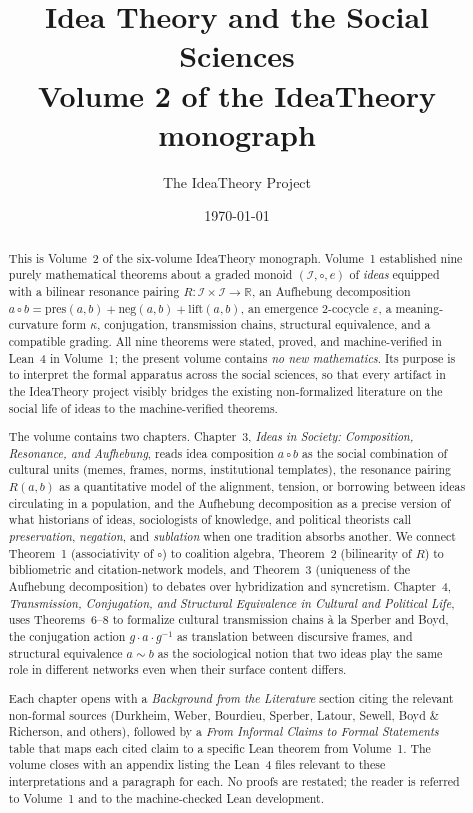 \documentclass[11pt,oneside]{book}
\title{Idea Theory and the Social Sciences\\
\large Volume 2 of the IdeaTheory monograph}
\author{The IdeaTheory Project}
\date{\today}
\begin{document}
\frontmatter
\maketitle

\begin{abstract}
This is Volume~2 of the six-volume IdeaTheory monograph. Volume~1
established nine purely mathematical theorems about a graded monoid
$(\mathcal{I},\circ,e)$ of \emph{ideas} equipped with a bilinear
resonance pairing $R\colon\mathcal{I}\times\mathcal{I}\to\mathbb{R}$,
an Aufhebung decomposition $a\circ b = \mathrm{pres}(a,b) +
\mathrm{neg}(a,b) + \mathrm{lift}(a,b)$, an emergence $2$-cocycle
$\varepsilon$, a meaning-curvature form $\kappa$, conjugation, transmission
chains, structural equivalence, and a compatible grading. All nine
theorems were stated, proved, and machine-verified in Lean~4 in
Volume~1; the present volume contains \emph{no new mathematics}. Its
purpose is to interpret the formal apparatus across the social
sciences, so that every artifact in the IdeaTheory project visibly
bridges the existing non-formalized literature on the social life of
ideas to the machine-verified theorems.

The volume contains two chapters. Chapter~3, \emph{Ideas in Society:
Composition, Resonance, and Aufhebung}, reads idea composition $a\circ
b$ as the social combination of cultural units (memes, frames, norms,
institutional templates), the resonance pairing $R(a,b)$ as a
quantitative model of the alignment, tension, or borrowing between
ideas circulating in a population, and the Aufhebung decomposition as
a precise version of what historians of ideas, sociologists of
knowledge, and political theorists call \emph{preservation},
\emph{negation}, and \emph{sublation} when one tradition absorbs
another. We connect Theorem~1 (associativity of $\circ$) to coalition
algebra, Theorem~2 (bilinearity of $R$) to bibliometric and
citation-network models, and Theorem~3 (uniqueness of the Aufhebung
decomposition) to debates over hybridization and syncretism.
Chapter~4, \emph{Transmission, Conjugation, and Structural
Equivalence in Cultural and Political Life}, uses Theorems~6--8 to
formalize cultural transmission chains à la Sperber and Boyd, the
conjugation action $g\!\cdot\!a\!\cdot\!g^{-1}$ as translation between
discursive frames, and structural equivalence $a\sim b$ as the
sociological notion that two ideas play the same role in different
networks even when their surface content differs.

Each chapter opens with a \emph{Background from the Literature}
section citing the relevant non-formal sources (Durkheim, Weber,
Bourdieu, Sperber, Latour, Sewell, Boyd \& Richerson, and others),
followed by a \emph{From Informal Claims to Formal Statements} table
that maps each cited claim to a specific Lean theorem from
Volume~1. The volume closes with an appendix listing the Lean~4
files relevant to these interpretations and a paragraph for each.
No proofs are restated; the reader is referred to Volume~1 and to the
machine-checked Lean development.
\end{abstract}
\end{document}
